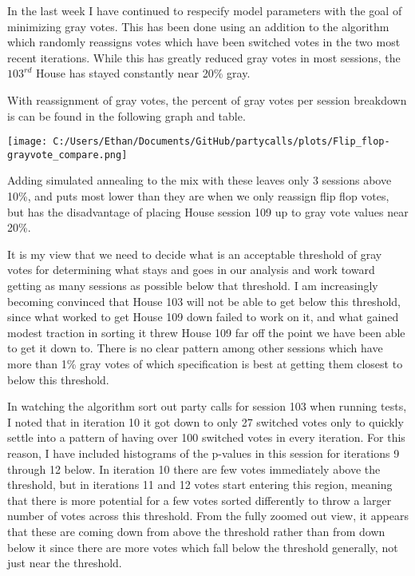 \documentclass[12pt]{article}
\begin{document}
In the last week I have continued to respecify model parameters with the goal of minimizing gray votes. This has been done using an addition to the algorithm which randomly reassigns votes which have been switched votes in the two most recent iterations. While this has greatly reduced gray votes in most sessions, the $103^{rd}$ House has stayed constantly near 20\% gray.

With reassignment of gray votes, the percent of gray votes per session breakdown is can be found in the following graph and table.

\begin{center}

\texttt{[image: C:/Users/Ethan/Documents/GitHub/partycalls/plots/Flip\_flop-grayvote\_compare.png]}

\end{center}

Adding simulated annealing to the mix with these leaves only 3 sessions above 10\%, and puts most lower than they are when we only reassign flip flop votes, but has the disadvantage of placing House session 109 up to gray vote values near 20\%. 

It is my view that we need to decide what is an acceptable threshold of gray votes for determining what stays and goes in our analysis and work toward getting as many sessions as possible below that threshold. I am increasingly becoming convinced that House 103 will not be able to get below this threshold, since what worked to get House 109 down failed to work on it, and what gained modest traction in sorting it threw House 109 far off the point we have been able to get it down to. There is no clear pattern among other sessions which have more than 1\% gray votes of which specification is best at getting them closest to below this threshold.

In watching the algorithm sort out party calls for session 103 when running tests, I noted that in iteration 10 it got down to only 27 switched votes only to quickly settle into a pattern of having over 100 switched votes in every iteration. For this reason, I have included histograms of the p-values in this session for iterations 9 through 12 below. In iteration 10 there are few votes immediately above the threshold, but in iterations 11 and 12 votes start entering this region, meaning that there is more potential for a few votes sorted differently to throw a larger number of votes across this threshold. From the fully zoomed out view, it appears that these are coming down from above the threshold rather than from down below it since there are more votes which fall below the threshold generally, not just near the threshold.
\end{document}
